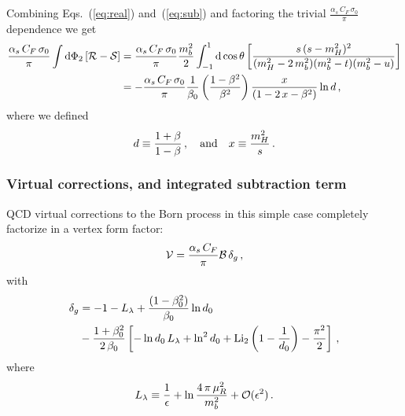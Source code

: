 Combining Eqs.~(\ref{eq:real}) and~(\ref{eq:sub}) and factoring
the trivial $\frac{\alpha_s\,C_F\,\sigma_0}{\pi}$ dependence we get
\begin{equation}
  \begin{split}
    \frac{\alpha_s\,C_F\,\sigma_0}{\pi}
    \int{\rm d}\Phi_2 \left[{\cal R} -{\cal S}\right] & =
    \frac{\alpha_s\,C_F\,\sigma_0}{\pi}\frac{m_b^2}{2}
    \int_{-1}^1{\rm d}\cos\theta
    \left[\frac{s\,(s-m_H^2)^2}{(m_H^2-2\,m_b^2)(m_b^2-t)(m_b^2-u)}
    \right]\\
    & = -\frac{\alpha_s\,C_F\,\sigma_0}{\pi}
    \frac{1}{\beta_0}\left(\frac{ 1-\beta^2 }{\beta^2}\right)
    \frac{x}{\left( 1 - 2\,x - \beta^2\right)}\ln d\,,
  \end{split}
\end{equation}
where we defined
\begin{equation}
  d \equiv \frac{1+\beta}{1-\beta}\,,
  \quad {\rm and}\quad x\equiv \frac{m_H^2}{s}\,.
\end{equation}

\subsubsection{Virtual corrections, and integrated subtraction term}
QCD virtual corrections to the Born process in this simple case
completely factorize in a vertex form factor:
\begin{equation}
  {\cal V} = \frac{\alpha_s\,C_F}{\pi}{\cal B}\,\delta_g\,,
\end{equation}
with
\begin{align}
  \delta_g &= -1 - L_{\lambda} +
  \frac{(1-\beta_0^2)}{\beta_0} \ln d_0 \nonumber\\
  &- \frac{1+\beta_0^2}{2\,\beta_0}\left[-\ln d_0\,L_{\lambda} + \ln^2d_0+{\rm Li}_2\left(
      1-\frac{1}{d_0} \right) -\frac{\pi^2}{2} \right]\,,
\end{align}
where
\begin{equation}
  L_{\lambda} \equiv \frac{1}{\epsilon} + \ln\frac{4\,\pi\,\mu_R^2}{m_b^2}
  +{\cal O}(\epsilon^2)\,.
\end{equation}


